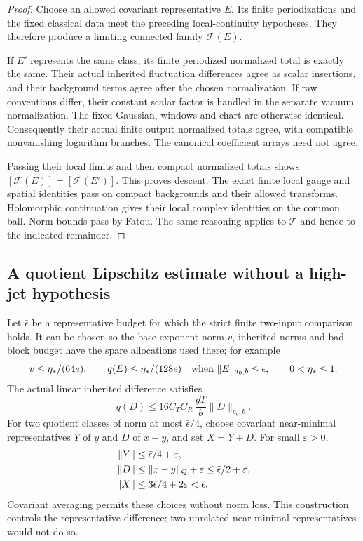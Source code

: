 \begin{proof}
Choose an allowed covariant representative \(E\). Its finite
periodizations and the fixed classical data meet the preceding
local-continuity hypotheses. They therefore produce a limiting
connected family \(\mathcal F(E)\).

If \(E'\) represents the same class, its finite periodized
normalized total is exactly the same. Their actual inherited
fluctuation differences agree as scalar insertions, and their
background terms agree after the chosen normalization.
If raw conventions differ, their constant scalar factor is
handled in the separate vacuum normalization. The fixed
Gaussian, windows and chart are otherwise identical.
Consequently their actual finite output normalized totals
agree, with compatible nonvanishing logarithm branches.
The canonical coefficient arrays need not agree.

Passing their local limits and then compact normalized totals
shows \([\mathcal F(E)]=[\mathcal F(E')]\). This proves descent.
The exact finite local gauge and spatial identities pass on
compact backgrounds and their allowed transforms. Holomorphic
continuation gives their local complex identities on the
common ball. Norm bounds pass by Fatou. The same reasoning
applies to \(\mathcal T\) and hence to the indicated remainder.
\end{proof}

\subsection{A quotient Lipschitz estimate without a high-jet hypothesis}
\label{qll-Lipschitz-section}

Let \(\bar\epsilon\) be a representative budget for which the
strict finite two-input comparison holds. It can be chosen so
the base exponent norm \(v\), inherited norms and bad-block
budget have the spare allocations used there; for example
\begin{equation}
 v\le\eta_*/(64e),\qquad
 q(E)\le\eta_*/(128e)
       \quad\hbox{when }\|E\|_{a_0,b}\le\bar\epsilon,
 \qquad 0<\eta_*\le1.
 \label{qll-comparison-budgets}
\end{equation}
The actual linear inherited difference satisfies
\begin{equation}
 q(D)\le16C_TC_R\,\frac{gT}{b}\|D\|_{a_0,b}.
 \label{qll-increment-bound}
\end{equation}
For two quotient classes of norm at most \(\bar\epsilon/4\),
choose covariant near-minimal representatives \(Y\) of \(y\)
and \(D\) of \(x-y\), and set \(X=Y+D\). For small \(\varepsilon>0\),
\begin{align}
 \|Y\|&\le\bar\epsilon/4+\varepsilon,\notag\\
 \|D\|&\le\|x-y\|_{\mathcal Q}+\varepsilon
                    \le\bar\epsilon/2+\varepsilon,\notag\\
 \|X\|&\le3\bar\epsilon/4+2\varepsilon<\bar\epsilon .
 \label{qll-compatible-representatives}
\end{align}
Covariant averaging permits these choices without norm loss.
This construction controls the representative difference;
two unrelated near-minimal representatives would not do so.

